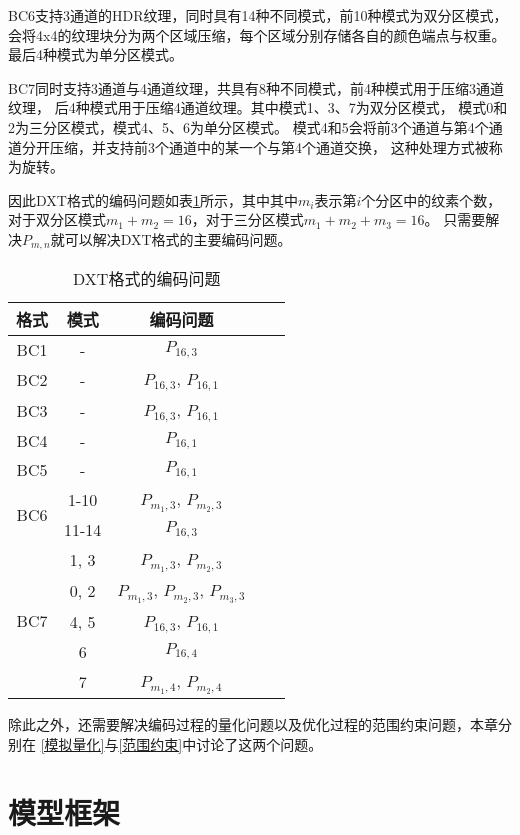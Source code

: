 BC6支持3通道的HDR纹理，同时具有14种不同模式，前10种模式为双分区模式，
会将4x4的纹理块分为两个区域压缩，每个区域分别存储各自的颜色端点与权重。
最后4种模式为单分区模式。

BC7同时支持3通道与4通道纹理，共具有8种不同模式，前4种模式用于压缩3通道纹理，
后4种模式用于压缩4通道纹理。其中模式1、3、7为双分区模式，
模式0和2为三分区模式，模式4、5、6为单分区模式。
模式4和5会将前3个通道与第4个通道分开压缩，并支持前3个通道中的某一个与第4个通道交换，
这种处理方式被称为旋转。

因此DXT格式的编码问题如表\ref{tab:DXTEncodeproblem}所示，其中其中$m_i$表示第$i$个分区中的纹素个数，
对于双分区模式$m_1+m_2=16$，对于三分区模式$m_1+m_2+m_3=16$。
只需要解决$P_{m,n}$就可以解决DXT格式的主要编码问题。
\begin{table}[htbp]
    \centering
    \caption{DXT格式的编码问题}
    \label{tab:DXTEncodeproblem}        
    \begin{tabular}{ccccc}
    \toprule
    格式    & 模式 & 编码问题 \\
    \midrule
    BC1   & -  & $P_{16,3}$               \\
    BC2   & - & $P_{16,3}$, $P_{16,1}$    \\
    BC3   & - & $P_{16,3}$, $P_{16,1}$    \\
    BC4   & - & $P_{16,1}$                  \\
    BC5   & - & $P_{16,1}$     \\
    \midrule
    \multirow{2}{*}{BC6}   & 1-10&   $P_{m_1,3}$, $P_{m_2,3}$     \\
       &11-14&  $P_{16,3}$     \\
    \midrule
    \multirow{5}{*}{BC7}   & 1, 3&   $P_{m_1,3}$, $P_{m_2,3}$     \\
        &0, 2&  $P_{m_1,3}$, $P_{m_2,3}$, $P_{m_3,3}$     \\  
        &4, 5&  $P_{16,3}$, $P_{16,1}$     \\    
        &6&  $P_{16,4}$     \\  
        &7&  $P_{m_1,4}$, $P_{m_2,4}$     \\
    \bottomrule
    \end{tabular}
\end{table}

除此之外，还需要解决编码过程的量化问题以及优化过程的范围约束问题，本章分别在
\ref{模拟量化}与\ref{范围约束}中讨论了这两个问题。


\section{模型框架}


